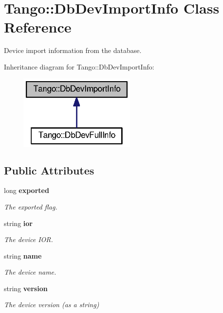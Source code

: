 \section{Tango\-:\-:Db\-Dev\-Import\-Info Class Reference}
\label{classTango_1_1DbDevImportInfo}


Device import information from the database.  




Inheritance diagram for Tango\-:\-:Db\-Dev\-Import\-Info\-:
\nopagebreak
\begin{figure}[H]
\begin{center}
\leavevmode
\includegraphics[width=164pt]{de/d5c/classTango_1_1DbDevImportInfo__inherit__graph}
\end{center}
\end{figure}
\subsection*{Public Attributes}
\begin{DoxyCompactItemize}
\item 
long {\bf exported}
\begin{DoxyCompactList}\small\item\em The exported flag. \end{DoxyCompactList}\item 
string {\bf ior}
\begin{DoxyCompactList}\small\item\em The device I\-O\-R. \end{DoxyCompactList}\item 
string {\bf name}
\begin{DoxyCompactList}\small\item\em The device name. \end{DoxyCompactList}\item 
string {\bf version}
\begin{DoxyCompactList}\small\item\em The device version (as a string) \end{DoxyCompactList}\end{DoxyCompactItemize}


